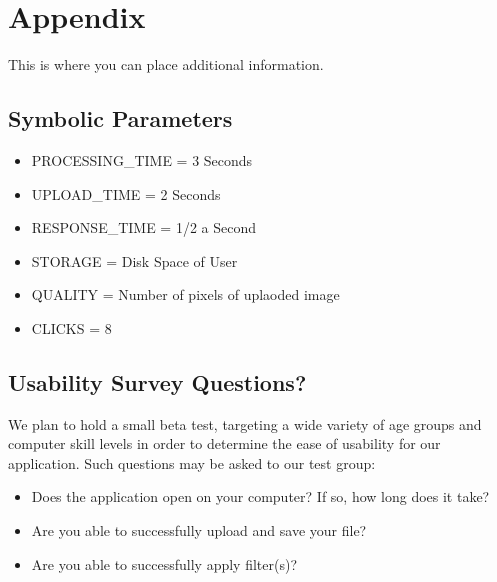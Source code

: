 \documentclass[12pt, titlepage]{article}
\begin{document}




\newpage

\section{Appendix}

This is where you can place additional information.

\subsection{Symbolic Parameters}

\begin{itemize}
\item PROCESSING\_TIME = 3 Seconds
\item UPLOAD\_TIME = 2 Seconds
\item RESPONSE\_TIME = 1/2 a Second
\item STORAGE = Disk Space of User
\item QUALITY = Number of pixels of uplaoded image
\item CLICKS = 8
\end{itemize}

\subsection{Usability Survey Questions?}

We plan to hold a small beta test, targeting a wide variety of age groups and computer skill levels in order to determine the ease of usability for our application.  Such questions may be asked to our test group:

\begin{itemize}
	\item Does the application open on your computer? If so, how long does it take?
	\item Are you able to successfully upload and save your file?
	\item Are you able to successfully apply filter(s)?
\end{itemize}
\end{document}
